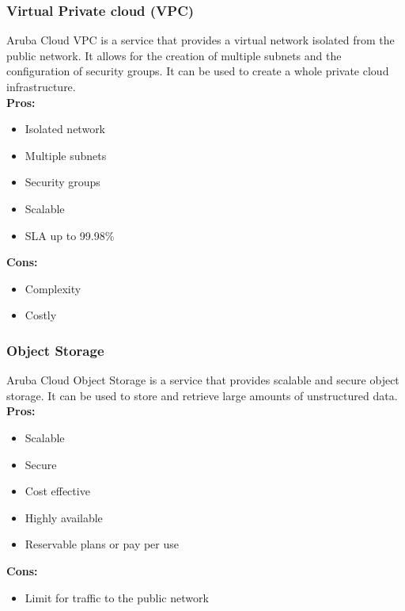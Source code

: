     \subsubsection{Virtual Private cloud (VPC)}
    \label{aruba-cloud:vpc}
    Aruba Cloud VPC is a service that provides a virtual network isolated from the public network. It allows for the creation of multiple subnets and the configuration of security groups. It can be used to create a whole private cloud infrastructure.\\
    \textbf{Pros:}
    \begin{itemize}
        \item Isolated network
        \item Multiple subnets
        \item Security groups
        \item Scalable
        \item SLA up to 99.98\%
    \end{itemize}
    \textbf{Cons:}
    \begin{itemize}
        \item Complexity
        \item Costly
    \end{itemize}

    \subsubsection{Object Storage}
    \label{aruba-cloud:object-storage}
    Aruba Cloud Object Storage is a service that provides scalable and secure object storage. It can be used to store and retrieve large amounts of unstructured data.\\
    \textbf{Pros:}
    \begin{itemize}
        \item Scalable
        \item Secure
        \item Cost effective
        \item Highly available
        \item Reservable plans or pay per use
    \end{itemize}
    \textbf{Cons:}
    \begin{itemize}
        \item Limit for traffic to the public network
    \end{itemize}

